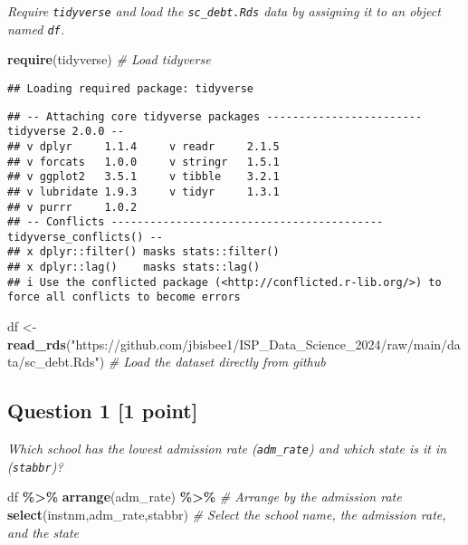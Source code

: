 \documentclass[
]{article}
\newenvironment{Shaded}{\begin{snugshade}}{\end{snugshade}}
\newcommand{\CommentTok}[1]{\textcolor[rgb]{0.56,0.35,0.01}{\textit{#1}}}
\newcommand{\FunctionTok}[1]{\textcolor[rgb]{0.13,0.29,0.53}{\textbf{#1}}}
\newcommand{\NormalTok}[1]{#1}
\newcommand{\OtherTok}[1]{\textcolor[rgb]{0.56,0.35,0.01}{#1}}
\newcommand{\SpecialCharTok}[1]{\textcolor[rgb]{0.81,0.36,0.00}{\textbf{#1}}}
\newcommand{\StringTok}[1]{\textcolor[rgb]{0.31,0.60,0.02}{#1}}
\begin{document}
\emph{Require \texttt{tidyverse} and load the \texttt{sc\_debt.Rds} data
by assigning it to an object named \texttt{df}.}

\begin{Shaded}
\begin{Highlighting}[]
\FunctionTok{require}\NormalTok{(tidyverse) }\CommentTok{\# Load tidyverse}
\end{Highlighting}
\end{Shaded}

\begin{verbatim}
## Loading required package: tidyverse
\end{verbatim}

\begin{verbatim}
## -- Attaching core tidyverse packages ------------------------ tidyverse 2.0.0 --
## v dplyr     1.1.4     v readr     2.1.5
## v forcats   1.0.0     v stringr   1.5.1
## v ggplot2   3.5.1     v tibble    3.2.1
## v lubridate 1.9.3     v tidyr     1.3.1
## v purrr     1.0.2     
## -- Conflicts ------------------------------------------ tidyverse_conflicts() --
## x dplyr::filter() masks stats::filter()
## x dplyr::lag()    masks stats::lag()
## i Use the conflicted package (<http://conflicted.r-lib.org/>) to force all conflicts to become errors
\end{verbatim}

\begin{Shaded}
\begin{Highlighting}[]
\NormalTok{df }\OtherTok{\textless{}{-}} \FunctionTok{read\_rds}\NormalTok{(}\StringTok{"https://github.com/jbisbee1/ISP\_Data\_Science\_2024/raw/main/data/sc\_debt.Rds"}\NormalTok{) }\CommentTok{\# Load the dataset directly from github}
\end{Highlighting}
\end{Shaded}

\subsection{Question 1 {[}1 point{]}}\label{question-1-1-point}

\emph{Which school has the lowest admission rate (\texttt{adm\_rate})
and which state is it in (\texttt{stabbr})?}

\begin{Shaded}
\begin{Highlighting}[]
\NormalTok{df }\SpecialCharTok{\%\textgreater{}\%} 
  \FunctionTok{arrange}\NormalTok{(adm\_rate) }\SpecialCharTok{\%\textgreater{}\%} \CommentTok{\# Arrange by the admission rate}
  \FunctionTok{select}\NormalTok{(instnm,adm\_rate,stabbr) }\CommentTok{\# Select the school name, the admission rate, and the state}
\end{Highlighting}
\end{Shaded}
\end{document}
